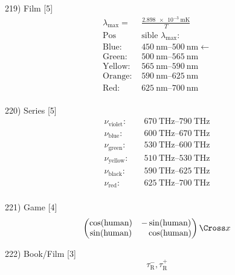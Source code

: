 \documentclass[10pt]{article}
\begin{document}
  219) Film [5]
  \[
    \begin{split}
      \lambda_\text{max} =&\frac{\SI{2.898e-3}{\metre\kelvin}}{T} \\
      \text{Pos} &\text{sible } \lambda_\text{max}: \\
      \text{Blue: } & \SI{450}{\nano\metre}\text{--}\SI{500}{\nano\metre} \leftarrow \\
      \text{Green: } & \SI{500}{\nano\metre}\text{--}\SI{565}{\nano\metre} \\
      \text{Yellow: } & \SI{565}{\nano\metre}\text{--}\SI{590}{\nano\metre} \\
      \text{Orange: } & \SI{590}{\nano\metre}\text{--}\SI{625}{\nano\metre} \\
      \text{Red: } & \SI{625}{\nano\metre}\text{--}\SI{700}{\nano\metre} \\
    \end{split}
  \]

  220) Series [5]
  \[
    \begin{split}
      \nu_\text{violet}:\quad&\SI{670}{\tera\hertz}\text{--}\SI{790}{\tera\hertz}\\
      \nu_\text{blue}: \quad& \SI{600}{\tera\hertz}\text{--}\SI{670}{\tera\hertz} \\
      \nu_\text{green}: \quad& \SI{530}{\tera\hertz}\text{--}\SI{600}{\tera\hertz} \\
      \nu_\text{yellow}: \quad& \SI{510}{\tera\hertz}\text{--}\SI{530}{\tera\hertz} \\
      \nu_\text{black}: \quad& \SI{590}{\tera\hertz}\text{--}\SI{625}{\tera\hertz} \\
      \nu_\text{red}: \quad& \SI{625}{\tera\hertz}\text{--}\SI{700}{\tera\hertz} \\
    \end{split}
  \]

  221) Game [4]
  \[
    \begin{pmatrix}
      \cos(\text{human}) & - \sin(\text{human}) \\
      \sin(\text{human}) & \phantom{-}\cos(\text{human}) \\
    \end{pmatrix}
      \text{\Cross}    x 
  \]

  222) Book/Film [3]
  \[
    \tau^-_\text{R}, \tau^+_\text{R} 
  \]
  
\end{document}
